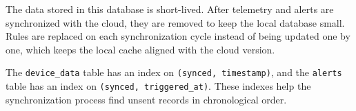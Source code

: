 The data stored in this database is short-lived. After telemetry and alerts are synchronized with the cloud, they are removed to keep the local database small. Rules are replaced on each synchronization cycle instead of being updated one by one, which keeps the local cache aligned with the cloud version.

The \texttt{device\_data} table has an index on \texttt{(synced, timestamp)}, and the \texttt{alerts} table has an index on \texttt{(synced, triggered\_at)}. These indexes help the synchronization process find unsent records in chronological order.
